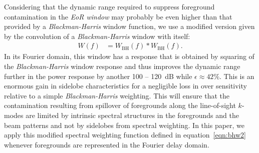 \documentclass[preprint2,iop,numberedappendix,twocolappendix,appendixfloats]{emulateapj}
\begin{document}
Considering that the dynamic range required to suppress foreground contamination in the {\it EoR window} may probably be even higher than that provided by a {\it Blackman-Harris} window function, we use a modified version given by the convolution of a {\it Blackman-Harris} window with itself:
\begin{align}\label{eqn:bhw2}
  W(f) &= W_\textrm{BH}(f) \ast W_\textrm{BH}(f).
\end{align}
In its Fourier domain, this window has a response that is obtained by squaring of the {\it Blackman-Harris} window response and thus improves the dynamic range further in the power response by another 100 -- 120~dB while $\epsilon\approx 42\%$. This is an enormous gain in sidelobe characteristics for a negligible loss in over sensitivity relative to a simple {\it Blackman-Harris} weighting. This will ensure that the contamination resulting from spillover of foregrounds along the line-of-sight $k$-modes are limited by intrinsic spectral structures in the foregrounds and the beam patterns and not by sidelobes from spectral weighting. In this paper, we apply this modified spectral weighting function defined in equation~\ref{eqn:bhw2} whenever foregrounds are represented in the Fourier delay domain. 
\end{document}
